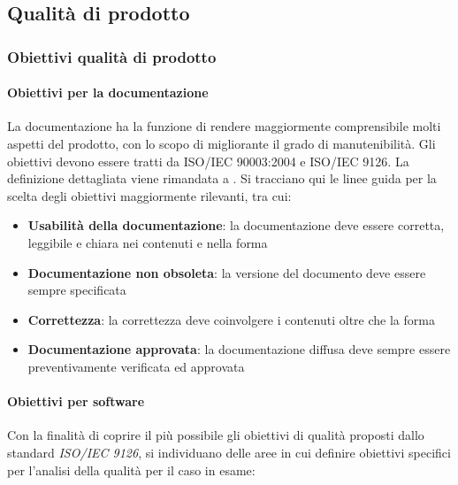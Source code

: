 \documentclass[12pt,a4paper]{article}
\begin{document}
	
	\subsection{Qualità di prodotto}
	
	\subsubsection{Obiettivi qualità di prodotto}
	
	\paragraph{Obiettivi per la documentazione}
	La documentazione ha la funzione di rendere maggiormente comprensibile molti aspetti del prodotto, con lo scopo di migliorante il grado di manutenibilità. 
	Gli obiettivi devono essere tratti da ISO/IEC 90003:2004 e ISO/IEC 9126. La definizione dettagliata viene rimandata a \NdP{}.
	Si tracciano qui le linee guida per la scelta degli obiettivi maggiormente rilevanti, tra cui:
	
	\begin{itemize}
		\item\textbf{Usabilità della documentazione}: la documentazione deve essere corretta, leggibile e chiara nei contenuti e nella forma
		\item\textbf{Documentazione non obsoleta}: la versione del documento deve essere sempre specificata
		\item\textbf{Correttezza}: la correttezza deve coinvolgere i contenuti oltre che la forma
		\item\textbf{Documentazione approvata}: la documentazione diffusa deve sempre essere preventivamente verificata ed approvata
	\end{itemize}
	
	\paragraph{Obiettivi per software}
	Con la finalità di coprire il più possibile gli obiettivi di qualità proposti dallo standard \textit{ISO/IEC 9126}, si individuano delle aree in cui definire obiettivi specifici per l'analisi della qualità  per il caso in esame:
	
\end{document}
